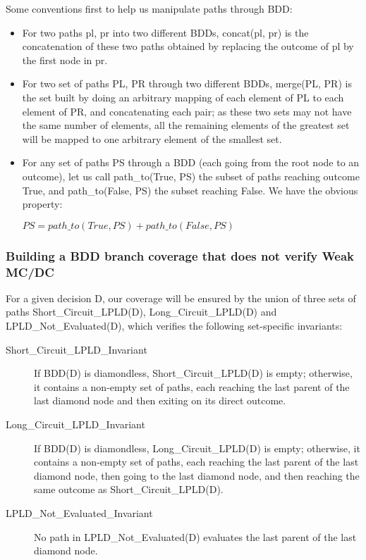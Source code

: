 \documentclass[a4paper,12pt,twoside]{article}
\begin{document}
Some conventions first to help us manipulate paths through BDD:

\begin{itemize}
\item For two paths pl, pr into two different BDDs,
  concat(pl, pr) is the concatenation of these two paths obtained by replacing
  the outcome of pl by the first node in pr.

\item For two set of paths PL, PR through two different BDDs, merge(PL, PR)
  is the set built by doing an arbitrary mapping of each element
  of PL to each element of PR, and concatenating each pair; as these
  two sets may not have the same number of elements, all the remaining
  elements of the greatest set will be mapped to one arbitrary element
  of the smallest set.

\item For any set of paths PS through a BDD (each going from the root node to
  an outcome), let us call path\_to(True, PS) the subset of paths reaching
  outcome True, and path\_to(False, PS) the subset reaching False. We have
  the obvious property:

  $PS = path\_to(True, PS) + path\_to(False, PS)$
\end{itemize}

\subsubsection{Building a BDD branch coverage that does not verify Weak MC/DC}

For a given decision D, our coverage will be ensured by the union of
three sets of paths Short\_Circuit\_LPLD(D), Long\_Circuit\_LPLD(D) and
LPLD\_Not\_Evaluated(D), which verifies the following set-specific
invariants:

\begin{description}
\item[Short\_Circuit\_LPLD\_Invariant]
  If BDD(D) is diamondless, Short\_Circuit\_LPLD(D) is empty;
  otherwise, it contains a non-empty set of paths, each reaching the
  last parent of the last diamond node and then exiting on its direct
  outcome.

\item[Long\_Circuit\_LPLD\_Invariant]
  If BDD(D) is diamondless, Long\_Circuit\_LPLD(D) is empty;
  otherwise, it contains a non-empty set of paths, each reaching the last
  parent of the last diamond node, then going to the last diamond node, and
  then reaching the same outcome as Short\_Circuit\_LPLD(D).

\item[LPLD\_Not\_Evaluated\_Invariant]
  No path in LPLD\_Not\_Evaluated(D) evaluates the last parent of the last
  diamond node.
\end{description}
\end{document}
